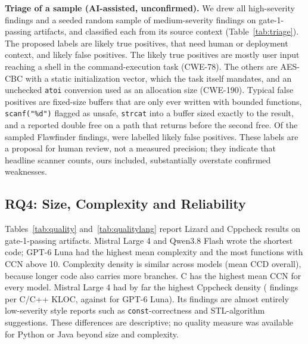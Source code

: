 \documentclass[conference]{IEEEtran}
\begin{document}
\textbf{Triage of a sample (AI-assisted, unconfirmed).}
\label{sec:triage}
We drew all \nTriageHigh{} high-severity findings and a seeded random sample of
\nTriageMedium{} medium-severity findings on gate-1-passing artifacts, and
classified each from its source context (Table~\ref{tab:triage}). The proposed
labels are \nTriageTP{} likely true positives, \nTriageNC{} that need human or
deployment context, and \nTriageFP{} likely false positives. The likely true
positives are mostly user input reaching a shell in the command-execution task
(CWE-78). The others are AES-CBC with a static initialization vector, which the
task itself mandates, and an unchecked \texttt{atoi} conversion used as an
allocation size (CWE-190). Typical false positives are fixed-size buffers that
are only ever written with bounded functions, \texttt{scanf("\%d")} flagged as
unsafe, \texttt{strcat} into a buffer sized exactly to the result, and a
reported double free on a path that returns before the second free. Of the
\nFlawfinderSampled{} sampled Flawfinder findings, \nFlawfinderFP{} were
labelled likely false positives. These labels are a proposal for human review,
not a measured precision; they indicate that headline scanner counts, ours
included, substantially overstate confirmed weaknesses.

\begin{table}[t]
\caption{AI-proposed triage of \nTriage{} sampled findings (not human-confirmed)}
\label{tab:triage}
\centering\footnotesize

\end{table}

\subsection{RQ4: Size, Complexity and Reliability}

Tables~\ref{tab:quality} and~\ref{tab:qualitylang} report Lizard and Cppcheck
results on gate-1-passing artifacts. Mistral Large 4 and Qwen3.8 Flash wrote the
shortest code; GPT-6 Luna had the highest mean complexity and the most functions
with CCN above 10. Complexity density is similar across models (mean CCD
\ccdAll{} overall), because longer code also carries more branches. C has the
highest mean CCN for every model. Mistral Large 4 had by far the highest
Cppcheck density (\cppcheckMistral{} findings per C/C++ KLOC, against
\cppcheckLuna{} for GPT-6 Luna). Its findings are almost entirely low-severity
style reports such as \texttt{const}-correctness and STL-algorithm suggestions.
These differences are descriptive; no quality measure was available for Python
or Java beyond size and complexity.
\end{document}
